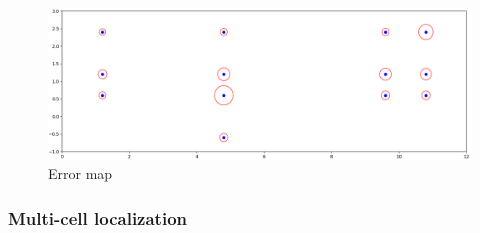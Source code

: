 \documentclass[\main/main.tex]{subfiles}
\begin{document}
\begin{figure}[ht]
    \begin{minipage}[t]{\textwidth}       
        \centering
        \includegraphics[width=1\textwidth]{result.png}
    \end{minipage}
    \caption{Error map}
    \label{fig:rms_error}
\end{figure}

\subsubsection*{Multi-cell localization}
\end{document}
